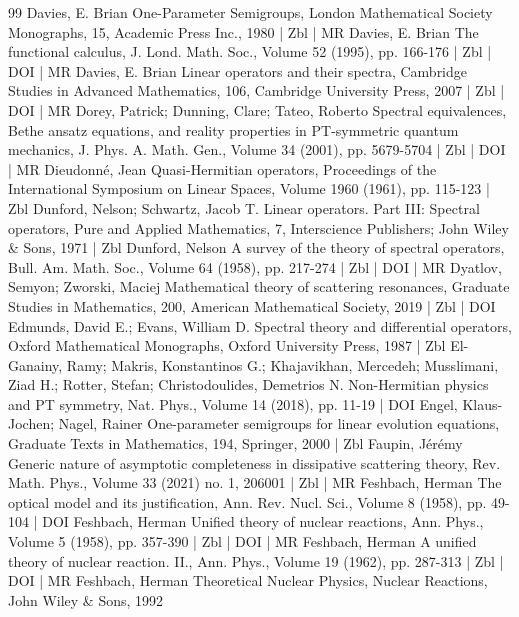 \begin{thebibliography}{99}
Davies, E. Brian One-Parameter Semigroups, London Mathematical Society Monographs, 15, Academic Press Inc., 1980 | Zbl | MR
Davies, E. Brian The functional calculus, J. Lond. Math. Soc., Volume 52 (1995), pp. 166-176 | Zbl | DOI | MR
Davies, E. Brian Linear operators and their spectra, Cambridge Studies in Advanced Mathematics, 106, Cambridge University Press, 2007 | Zbl | DOI | MR
Dorey, Patrick; Dunning, Clare; Tateo, Roberto Spectral equivalences, Bethe ansatz equations, and reality properties in PT-symmetric quantum mechanics, J. Phys. A. Math. Gen., Volume 34 (2001), pp. 5679-5704 | Zbl | DOI | MR
Dieudonné, Jean Quasi-Hermitian operators, Proceedings of the International Symposium on Linear Spaces, Volume 1960 (1961), pp. 115-123 | Zbl
Dunford, Nelson; Schwartz, Jacob T. Linear operators. Part III: Spectral operators, Pure and Applied Mathematics, 7, Interscience Publishers; John Wiley \& Sons, 1971 | Zbl
Dunford, Nelson A survey of the theory of spectral operators, Bull. Am. Math. Soc., Volume 64 (1958), pp. 217-274 | Zbl | DOI | MR
Dyatlov, Semyon; Zworski, Maciej Mathematical theory of scattering resonances, Graduate Studies in Mathematics, 200, American Mathematical Society, 2019 | Zbl | DOI
Edmunds, David E.; Evans, William D. Spectral theory and differential operators, Oxford Mathematical Monographs, Oxford University Press, 1987 | Zbl
El-Ganainy, Ramy; Makris, Konstantinos G.; Khajavikhan, Mercedeh; Musslimani, Ziad H.; Rotter, Stefan; Christodoulides, Demetrios N. Non-Hermitian physics and PT symmetry, Nat. Phys., Volume 14 (2018), pp. 11-19 | DOI
Engel, Klaus-Jochen; Nagel, Rainer One-parameter semigroups for linear evolution equations, Graduate Texts in Mathematics, 194, Springer, 2000 | Zbl
Faupin, Jérémy Generic nature of asymptotic completeness in dissipative scattering theory, Rev. Math. Phys., Volume 33 (2021) no. 1, 206001 | Zbl | MR
Feshbach, Herman The optical model and its justification, Ann. Rev. Nucl. Sci., Volume 8 (1958), pp. 49-104 | DOI
Feshbach, Herman Unified theory of nuclear reactions, Ann. Phys., Volume 5 (1958), pp. 357-390 | Zbl | DOI | MR
Feshbach, Herman A unified theory of nuclear reaction. II., Ann. Phys., Volume 19 (1962), pp. 287-313 | Zbl | DOI | MR
Feshbach, Herman Theoretical Nuclear Physics, Nuclear Reactions, John Wiley \& Sons, 1992

\end{thebibliography}
